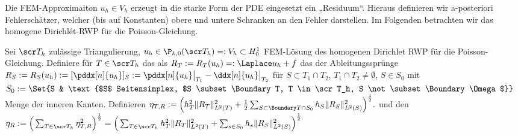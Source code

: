 Die FEM-Approximaiton $u_h \in V_h$ erzeugt in die starke Form der PDE eingesetzt ein „Residuum“.
Hieraus definieren wir a-posteriori Fehlerschätzer, welcher (bis auf Konstanten) obere und untere Schranken an den Fehler darstellen.
Im Folgenden betrachten wir das homogene Dirichlét-RWP für die Poisson-Gleichung.

\begin{df} \label{3.88}
	Sei $\scr T_h$ zulässige Triangulierung, $u_h \in \P_{k,0}(\scr T_h) =: V_h \subset H_0^1$ FEM-Lösung des homogenen Dirichlet RWP für die Poisson-Gleichung.
	Definiere für $T \in \scr T_h$ das  als
	\begin{math}
		R_T := R_T(u_h) =: \Laplace u_h + f
	\end{math}
	das  der Ableitungssprünge
	\begin{math}
		R_S := R_S(u_h) := [ \pddx[n]{u_h} ]_S := \pddx[n]{u_h}\big|_{T_1} - \ddx[n]{u_h}\big|_{T_2}
	\end{math}
	für $S \subset T_1 \cap T_2$, $T_1 \cap T_2 \neq \emptyset$, $S \in S_0$ mit
	\begin{math}
		S_0 := \Set{S & \text{$S$ Seitensimplex, $S \subset \Boundary T, T \in \scr T_h, S \not\subset \Boundary \Omega$}}
	\end{math}
	Menge der inneren Kanten.
	Definieren 
	\begin{math}
		\eta_{T,R} := \Big( h_T^2 \|R_T\|_{L^2(T)}^2 + \frac{1}{2} \sum_{S \subset \Boundary T \cap S_0} h_S \|R_S\|_{L^2(S)}^2 \Big)^{\frac{1}{2}}.
	\end{math}
	und den 
	\begin{math}
		\eta_R := \Big( \sum_{T \in \scr T_h} \eta_{T, R}^2 \Big)^{\frac 12}
		= \Big( \sum_{T \in \scr T_h} h_T^2 \|R_T\|_{L^2(T)}^2 + \sum_{s \in S_0} h_s \|R_S\|_{L^2(S)}^2 \Big)^{\frac{1}{2}}
	\end{math}
\end{df}

